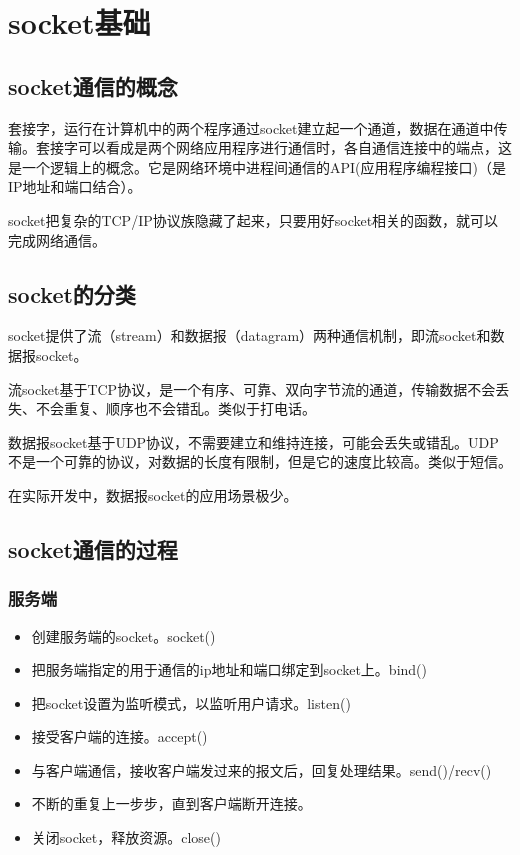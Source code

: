 \documentclass[UTF8]{article}%
\begin{document}
\section{socket基础}

\subsection{socket通信的概念}

套接字，运行在计算机中的两个程序通过socket建立起一个通道，数据在通道中传输。套接字可以看成是两个网络应用程序进行通信时，各自通信连接中的端点，这是一个逻辑上的概念。它是网络环境中进程间通信的API(应用程序编程接口)（是IP地址和端口结合）。

socket把复杂的TCP/IP协议族隐藏了起来，只要用好socket相关的函数，就可以完成网络通信。

\subsection{socket的分类}

socket提供了流（stream）和数据报（datagram）两种通信机制，即流socket和数据报socket。

流socket基于TCP协议，是一个有序、可靠、双向字节流的通道，传输数据不会丢失、不会重复、顺序也不会错乱。类似于打电话。

数据报socket基于UDP协议，不需要建立和维持连接，可能会丢失或错乱。UDP不是一个可靠的协议，对数据的长度有限制，但是它的速度比较高。类似于短信。

在实际开发中，数据报socket的应用场景极少。

\subsection{socket通信的过程}

\subsubsection{服务端}

\begin{itemize}
    \item 创建服务端的socket。socket()
    \item 把服务端指定的用于通信的ip地址和端口绑定到socket上。bind()
    \item 把socket设置为监听模式，以监听用户请求。listen()
    \item 接受客户端的连接。accept()
    \item 与客户端通信，接收客户端发过来的报文后，回复处理结果。send()/recv()
    \item 不断的重复上一步步，直到客户端断开连接。
    \item 关闭socket，释放资源。close()
\end{itemize}
\end{document}

